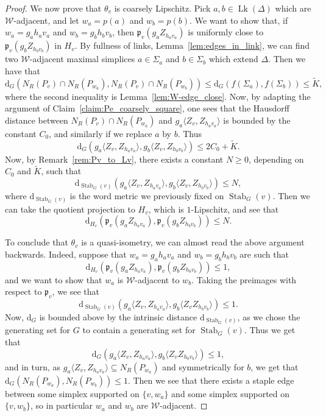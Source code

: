 \documentclass[svgnames]{amsart}
\theoremstyle{plain}
\theoremstyle{definition}
\newcommand{\dist}{\mathrm{d}}
\newcommand{\link}{\operatorname{Lk}}
\newcommand{\Stab}[2]{\operatorname{Stab}_{#1}(#2)}
\newcommand{\W}{\mathcal{W}}
\newcommand{\p}{\mathfrak{p}}
\begin{document}
\begin{proof}
We now prove that $\theta_v$ is coarsely Lipschitz. Pick $a,b\in\link(\Delta)$ which are $\W$-adjacent, and let $w_a=p(a)$ and $w_b=p(b)$. We want to show that, if $w_a=g_a h_a v_a$ and $w_b=g_b h_b v_b$, then $\p_v(g_a Z_{h_av_a})$ is uniformly close to $\p_v(g_b Z_{h_bv_b})$ in $H_v$. By fullness of links, Lemma~\ref{lem:edges_in_link}, we can find two $\W$-adjacent maximal simplices $a\in \Sigma_a$ and $b\in\Sigma_b$ which extend $\Delta$. Then we have that
$$\dist_G(N_R(P_v)\cap N_R(P_{w_a}), N_R(P_v)\cap N_R(P_{w_b}))\le \dist_G(f(\Sigma_a),f(\Sigma_b))\le \widetilde{K},$$
where the second inequality is Lemma~\ref{lem:W-edge_close}. Now, by adapting the argument of Claim~\ref{claim:Pe_coarsely_square}, one sees that the Hausdorff distance between $N_R(P_v)\cap N_R(P_{w_a})$ and $g_a\langle Z_v, Z_{h_a v_a}\rangle$ is bounded by the constant $C_0$, and similarly if we replace $a$ by $b$. Thus
$$\dist_G(g_a\langle Z_v, Z_{h_a v_a}\rangle,g_b\langle Z_v, Z_{h_b v_b}\rangle)\le 2C_0+ \widetilde{K}.$$
Now, by Remark~\ref{rem:Pv_to_Lv}, there exists a constant $N\ge 0$, depending on $C_0$ and $\widetilde{K}$, such that 
$$\dist_{\Stab{G}{v}}(g_a\langle Z_v, Z_{h_a v_a}\rangle,g_b\langle Z_v, Z_{h_b v_b}\rangle)\le N,$$
where $\dist_{\Stab{G}{v}}$ is the word metric we previously fixed on $\Stab{G}{v}$. Then we can take the quotient projection to $H_v$, which is $1$-Lipschitz, and see that 
$$\dist_{H_v}(\p_v(g_a Z_{h_av_a}),\p_v(g_b Z_{h_bv_b}))\le N.$$

To conclude that $\theta_v$ is a quasi-isometry, we can almost read the above argument backwards. Indeed, suppose that $w_a=g_a h_a v_a$ and $w_b=g_b h_b v_b$ are such that $$\dist_{H_v}(\p_v(g_a Z_{h_av_a}),\p_v(g_b Z_{h_bv_b}))\le 1,$$
and we want to show that $w_a$ is $\W$-adjacent to $w_b$. Taking the preimages with respect to $\p_v$, we see that 
$$\dist_{\Stab{G}{v}}(g_a \langle Z_v, Z_{h_av_a}\rangle,g_b \langle Z_vZ_{h_bv_b}\rangle)\le 1.$$
Now, $\dist_G$ is bounded above by the intrinsic distance $\dist_{\Stab{G}{v}}$, as we chose the generating set for $G$ to contain a generating set for $\Stab{G}{v}$. Thus we get that 
$$\dist_G(g_a \langle Z_v, Z_{h_av_a}\rangle,g_b \langle Z_vZ_{h_bv_b}\rangle)\le 1,$$
and in turn, as $g_a \langle Z_v, Z_{h_av_a}\rangle\subseteq N_R(P_{w_a})$ and symmetrically for $b$, we get that $\dist_G(N_R(P_{w_a}), N_R(P_{w_b}))\le 1$. Then we see that there exists a staple edge between some simplex supported on $\{v,w_a\}$ and some simplex supported on $\{v,w_b\}$, so in particular $w_a$ and $w_b$ are $\W$-adjacent.
\end{proof}
\end{document}
